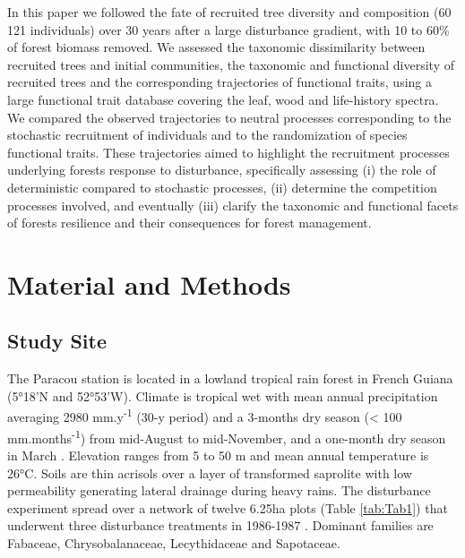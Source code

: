 \documentclass[fleqn,10pt]{ArtEcoFoG} %
\begin{document}
In this paper we followed the fate of recruited tree diversity and
composition (60 121 individuals) over 30 years after a large disturbance
gradient, with 10 to 60\% of forest biomass removed. We assessed the
taxonomic dissimilarity between recruited trees and initial communities,
the taxonomic and functional diversity of recruited trees and the
corresponding trajectories of functional traits, using a large
functional trait database covering the leaf, wood and life-history
spectra. We compared the observed trajectories to neutral processes
corresponding to the stochastic recruitment of individuals and to the
randomization of species functional traits. These trajectories aimed to
highlight the recruitment processes underlying forests response to
disturbance, specifically assessing (i) the role of deterministic
compared to stochastic processes, (ii) determine the competition
processes involved, and eventually (iii) clarify the taxonomic and
functional facets of forests resilience and their consequences for
forest management.

\section{Material and Methods}\label{material-and-methods}

\subsection{Study Site}\label{study-site}

The Paracou station is located in a lowland tropical rain forest in
French Guiana (5°18'N and 52°53'W). Climate is tropical wet with mean
annual precipitation averaging 2980 mm.y\textsuperscript{-1} (30-y
period) and a 3-months dry season (\textless{} 100
mm.months\textsuperscript{-1}) from mid-August to mid-November, and a
one-month dry season in March \citep{Wagner2011}. Elevation ranges from
5 to 50 m and mean annual temperature is 26°C. Soils are thin acrisols
over a layer of transformed saprolite with low permeability generating
lateral drainage during heavy rains. The disturbance experiment spread
over a network of twelve 6.25ha plots (Table \ref{tab:Tab1}) that
underwent three disturbance treatments in 1986-1987 \citep{Herault2018}.
Dominant families are Fabaceae, Chrysobalanaceae, Lecythidaceae and
Sapotaceae.
\end{document}

